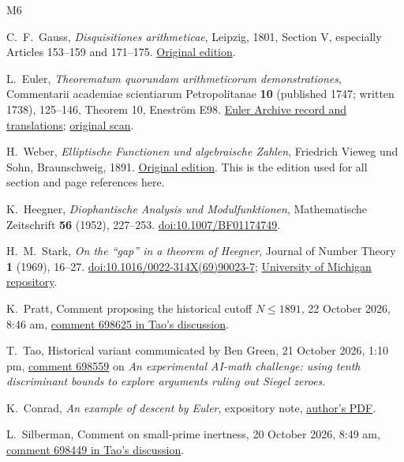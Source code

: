 \documentclass[11pt]{article}
\newcommand{\blog}{https://terrytao.wordpress.com/2026/10/20/an-experimental-ai-math-challenge-using-tenth-discriminant-bounds-to-explore-arguments-ruling-out-siegel-zeroes/}
\begin{document}
\clearpage
\begin{thebibliography}{M6}

C.~F.~Gauss, \emph{Disquisitiones arithmeticae}, Leipzig, 1801,
Section V, especially Articles 153--159 and 171--175.
\href{https://doi.org/10.3931/e-rara-4025}{Original edition}.

L.~Euler, \emph{Theorematum quorundam arithmeticorum
demonstrationes}, Commentarii academiae scientiarum Petropolitanae
\textbf{10} (published 1747; written 1738), 125--146,
Theorem 10, Enestr\"om E98.
\href{https://scholarlycommons.pacific.edu/euler-works/98/}{Euler Archive record and translations};
\href{https://math.dartmouth.edu/~euler/docs/originals/E098.pdf}{original scan}.

H.~Weber, \emph{Elliptische Functionen und algebraische Zahlen},
Friedrich Vieweg und Sohn, Braunschweig, 1891.
\href{https://archive.org/details/ellipfuncundalg00weberich}{Original edition}.
This is the edition used for all section and page references here.

K.~Heegner, \emph{Diophantische Analysis und Modulfunktionen},
Mathematische Zeitschrift \textbf{56} (1952), 227--253.
\href{https://doi.org/10.1007/BF01174749}{doi:10.1007/BF01174749}.

H.~M.~Stark, \emph{On the ``gap'' in a theorem of Heegner},
Journal of Number Theory \textbf{1} (1969), 16--27.
\href{https://doi.org/10.1016/0022-314X(69)90023-7}{doi:10.1016/0022-314X(69)90023-7};
\href{https://hdl.handle.net/2027.42/33039}{University of Michigan repository}.

K.~Pratt, Comment proposing the historical cutoff \(N\le1891\),
22 October 2026, 8:46 am,
\href{\blog comment-page-1/\#comment-698625}{comment 698625 in Tao's discussion}.

T.~Tao, Historical variant communicated by Ben Green,
21 October 2026, 1:10 pm,
\href{\blog\#comment-698559}{comment 698559}
on \emph{An experimental AI-math challenge: using tenth discriminant
bounds to explore arguments ruling out Siegel zeroes}.

K.~Conrad, \emph{An example of descent by Euler}, expository note,
\href{https://kconrad.math.uconn.edu/blurbs/ugradnumthy/descentbyeuler.pdf}{author's PDF}.

L.~Silberman, Comment on small-prime inertness,
20 October 2026, 8:49 am,
\href{\blog\#comment-698449}{comment 698449 in Tao's discussion}.

\end{thebibliography}
\end{document}
